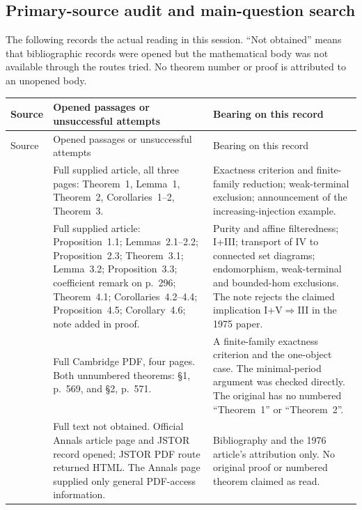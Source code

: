 \subsection{Primary-source audit and main-question search}
\label{subsec:source-audit}
The following records the actual reading in this session. ``Not obtained''
means that bibliographic records were opened but the mathematical body was
not available through the routes tried. No theorem number or proof is
attributed to an unopened body.

\begingroup
\small
\setlength{\tabcolsep}{4pt}
\begin{longtable}{@{}p{}p{}p{}@{}}
\toprule
Source & Opened passages or unsuccessful attempts & Bearing on this record \\
\midrule
\endfirsthead
\toprule
Source & Opened passages or unsuccessful attempts & Bearing on this record \\
\midrule
\endhead
\bottomrule
\endfoot
\citet{IsbellMitchell1973}
& Full supplied article, all three pages: Theorem~1, Lemma~1, Theorem~2,
Corollaries~1--2, Theorem~3.
& Exactness criterion and finite-family reduction; weak-terminal exclusion;
announcement of the increasing-injection example. \\

\citet{IsbellMitchell1976}
& Full supplied article: Proposition~1.1; Lemmas~2.1--2.2;
Proposition~2.3; Theorem~3.1; Lemma~3.2; Proposition~3.3;
coefficient remark on p.~296; Theorem~4.1; Corollaries~4.2--4.4;
Proposition~4.5; Corollary~4.6; note added in proof.
& Purity and affine filteredness; I+III; transport of IV to connected
set diagrams; endomorphism, weak-terminal and bounded-hom exclusions.
The note rejects the claimed implication I+V$\Rightarrow$III in the
1975 paper. \\

\citet{Isbell1968}
& Full Cambridge PDF, four pages. Both unnumbered theorems:
\S1, p.~569, and \S2, p.~571.
& A finite-family exactness criterion and the one-object case.
The minimal-period argument was checked directly. The original has no
numbered ``Theorem~1'' or ``Theorem~2''. \\

\citet{Isbell1974}
& Full text not obtained. Official Annals article page and JSTOR record
opened; JSTOR PDF route returned HTML. The Annals page supplied only
general PDF-access information.
& Bibliography and the 1976 article's attribution only. No original
proof or numbered theorem claimed as read. \\


\end{longtable}

